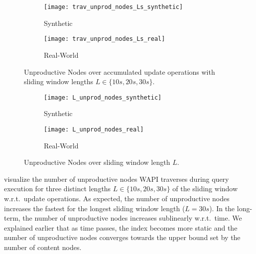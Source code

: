 \documentclass[abstracton,12pt]{scrartcl}
\theoremstyle{definition}
\begin{document}
\begin{figure}[h]
  \centering
  \begin{subfigure}{0.49\linewidth}
    \centering
    \caption{Synthetic}
    \texttt{[image: trav\_unprod\_nodes\_Ls\_synthetic]}
    \label{fig:trav_unprod_nodes_Ls_synthetic}
  \end{subfigure}
  \begin{subfigure}{0.49\linewidth}
    \centering
    \caption{Real-World}
    \texttt{[image: trav\_unprod\_nodes\_Ls\_real]}
    \label{fig:trav_unprod_nodes_Ls_real}
  \end{subfigure}
  \vspace{-0.65cm}
  \caption[Unproductive Nodes over update operations with lengths 
    $L \in \{10s,20s,30s\}$]{Unproductive Nodes over accumulated update operations with
    sliding window lengths $L \in \{10s,20s,30s\}$.}
\end{figure}

\begin{figure}[h]
  \centering
  \begin{subfigure}{0.49\linewidth}
    \centering
    \caption{Synthetic}
    \texttt{[image: L\_unprod\_nodes\_synthetic]}
    \label{fig:L_trav_unprod_nodes_synthetic}
  \end{subfigure}
  \begin{subfigure}{0.49\linewidth}
    \centering
    \caption{Real-World}
    \texttt{[image: L\_unprod\_nodes\_real]}
    \label{fig:L_trav_unprod_nodes_real}
  \end{subfigure}
  \vspace{-0.65cm}
  \caption[Unproductive Nodes over sliding window length $L$]{
  Unproductive Nodes over sliding window length $L$.}
\end{figure}

 visualize
the number of unproductive nodes WAPI traverses during query execution for
three distinct lengths $L \in \{10s,20s,30s\}$ of the sliding window w.r.t.\ update
operations. As expected, the number of unproductive nodes
increases the fastest for the longest sliding window length ($L = 30s$).
In the long-term,
the number of unproductive nodes increases sublinearly w.r.t.\ time.
We explained earlier that as time passes, the index becomes more static 
and the number of unproductive nodes converges towards the upper bound
set by the number of content nodes.
\end{document}
